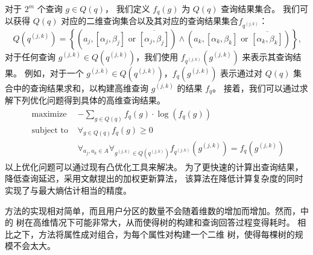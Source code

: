 \begin{enumerate}
对于 $2^m$ 个查询 $g \in Q(q)$，
我们定义 $f_q(g)$ 为 $Q(q)$ 查询结果集合。
我们可以获得 $Q(q)$ 对应的二维查询集合以及其对应的查询结果集合$f_{q^{(j,k)}}$：
$$Q(q^{(j,k)})=\left\{\left(a_{j},\left[\alpha_{j}, \beta_{j}\right] \text { or }\overline{\left[\alpha_{j}, \beta_{j}\right]}\right) \wedge \left(a_{k},\left[\alpha_{k}, \beta_{k}\right] \text { or }\overline{\left[\alpha_{k}, \beta_{k}\right]}\right)\right\}\text{,}$$
对于任何查询 $g^{(j,k)} \in Q(q^{(j,k)})$，我们使用 $f_{q^{(j,k)}}(g^{(j,k)})$ 来表示其查询结果。
例如，对于一个 $g^{(j,k)} \in Q(q^{(j,k)})$，$f_{q}(g^{(j,k)})$ 表示通过对 $Q(q)$ 集合中的查询结果求和，以构建高维查询 $g^{(j,k)}$ 的结果 $f_q$。
接着，我们可以通过求解下列优化问题得到具体的高维查询结果。
$$
\begin{array}{ll}
\text { maximize } & -\sum_{g \in Q(q)} f_{q}(g) \cdot \log \left(f_{q}(g)\right) \\
\text { subject to } & \forall_{g \in Q(q)} f_{q}(g) \geq 0 \\
& \forall_{a_j, a_k \in A} \forall_{g^{(j, k)} \in Q\left(q^{(j, k)}\right)} f_{q^{(j, k)}}(g^{(j, k)})=f_{q}(g^{(j, k)})
\end{array}
$$
以上优化问题可以通过现有凸优化工具来解决。
为了更快速的计算出查询结果，降低查询延迟，\myahead 采用文献{\rm\parencite{yang2020answering}}提出的加权更新算法，
该算法在降低计算复杂度的同时实现了与最大熵估计相当的精度。
\end{enumerate}

\de 方法的实现相对简单，而且用户分区的数量不会随着维数的增加而增加。然而，\de 中的 \myahead 树在高维情况下可能非常大，从而使得树的构建和查询回答过程变得耗时。
相比之下，\lle 方法将属性成对组合，为每个属性对构建一个二维 \myahead 树，使得每棵树的规模不会太大。


